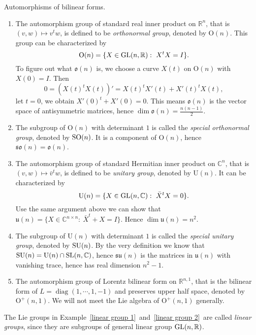 \begin{eg}\label{linear group 2}
    Automorphisms of bilinear forms.
    \begin{enumerate}[(1)]
        \item The automorphism group of standard real inner product on $\mathbb{R}^n$, that is $(v,w)\mapsto v^tw$, is defined to be \emph{orthonormal group}, denoted by $\mathrm{O}(n)$.
        This group can be characterized by
        \[\mathrm{O}(n)=\{X\in\GL(n,\mathbb{R}):\ X^tX=I\}.\]
        To figure out what $\mathfrak{o}(n)$ is, we choose a curve $X(t)$ on $\mathrm{O}(n)$ with $X(0)=I$.
        Then
        \[0=(X(t)^tX(t))'=X(t)^tX'(t)+X'(t)^tX(t),\]
        let $t=0$, we obtain $X'(0)^t+X'(0)=0$.
        This means $\mathfrak{o}(n)$ is the vector space of antisymmetric matrices, hence $\dim\mathfrak{o}(n)=\frac{n(n-1)}{2}$.
        \item The subgroup of $\mathrm{O}(n)$ with determinant $1$ is called the \emph{special orthonormal group}, denoted by $\mathrm{SO}(n)$.
        It is a component of $\mathrm{O}(n)$, hence $\mathfrak{so}(n)=\mathfrak{o}(n)$.
        \item The automorphism group of standard Hermitian inner product on $\mathbb{C}^n$, that is $(v,w)\mapsto \bar{v}^tw$, is defined to be \emph{unitary group}, denoted by $\mathrm{U}(n)$.
        It can be characterized by
        \[\mathrm{U}(n)=\{X\in\GL(n,\mathbb{C}):\ \bar{X}^tX=0\}.\]
        Use the same argument above we can show that $\mathfrak{u}(n)=\{X\in\mathbb{C}^{n\times n}:\ \bar{X}^t+X=I\}$.
        Hence $\dim\mathfrak{u}(n)=n^2$.
        \item The subgroup of $\mathrm{U}(n)$ with determinant $1$ is called the \emph{special unitary group}, denoted by $\mathrm{SU}(n)$.
        By the very definition we know that $\mathrm{SU}(n)=\mathrm{U}(n)\cap\mathrm{SL}(n,\mathbb{C})$, hence $\mathfrak{su}(n)$ is the matrices in $\mathfrak{u}(n)$ with vanishing trace, hence has real dimension $n^2-1$.
        \item The automorphism group of Lorentz bilinear form on $\mathbb{R}^{n,1}$, that is the bilinear form of $L=\operatorname{diag}{(1,\cdots,1,-1)}$ and preserves upper half space, denoted by $\mathrm{O}^+(n,1)$.
        We will not meet the Lie algebra of $\mathrm{O}^+(n,1)$ generally.
    \end{enumerate}
\end{eg}

\begin{rem}
    The Lie groups in Example~\ref{linear group 1}~and~\ref{linear group 2}~are called \emph{linear groups}, since they are subgroups of general linear group $\mathrm{GL}(n,\mathbb{R})$.
\end{rem}

